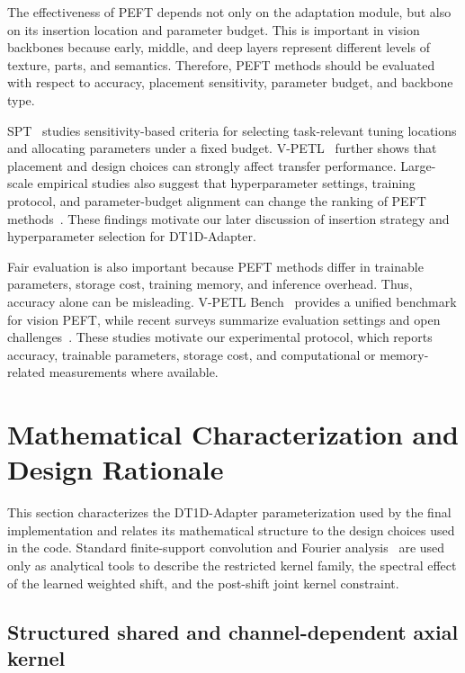 \documentclass[pdflatex,sn-mathphys-num]{sn-jnl}
\theoremstyle{thmstyleone}
\theoremstyle{thmstyletwo}
\theoremstyle{thmstylethree}
\begin{document}
The effectiveness of PEFT depends not only on the adaptation module, but also on its insertion location and parameter budget. 
This is important in vision backbones because early, middle, and deep layers represent different levels of texture, parts, and semantics. 
Therefore, PEFT methods should be evaluated with respect to accuracy, placement sensitivity, parameter budget, and backbone type.

SPT~\cite{he2023spt} studies sensitivity-based criteria for selecting task-relevant tuning locations and allocating parameters under a fixed budget. 
V-PETL~\cite{yu2022vpetl} further shows that placement and design choices can strongly affect transfer performance. 
Large-scale empirical studies also suggest that hyperparameter settings, training protocol, and parameter-budget alignment can change the ranking of PEFT methods~\cite{mai2025unifying}. 
These findings motivate our later discussion of insertion strategy and hyperparameter selection for DT1D-Adapter.

Fair evaluation is also important because PEFT methods differ in trainable parameters, storage cost, training memory, and inference overhead. 
Thus, accuracy alone can be misleading. 
V-PETL Bench~\cite{xin2024vpetlbench} provides a unified benchmark for vision PEFT, while recent surveys summarize evaluation settings and open challenges~\cite{yu2024visualtuning,xin2024visionpeftsurvey}. 
These studies motivate our experimental protocol, which reports accuracy, trainable parameters, storage cost, and computational or memory-related measurements where available.

\section{Mathematical Characterization and Design Rationale}
\label{sec:math_preliminaries}

This section characterizes the DT1D-Adapter parameterization used by the final implementation and relates its mathematical structure to the design choices used in the code. Standard finite-support convolution and Fourier analysis~\cite{grafakos2014classical,mallat2009wavelet} are used only as analytical tools to describe the restricted kernel family, the spectral effect of the learned weighted shift, and the post-shift joint kernel constraint.

\subsection{Structured shared and channel-dependent axial kernel}
\label{subsec:structured_kernel}
\end{document}

